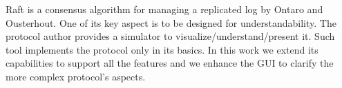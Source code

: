 Raft is a consensus algorithm for managing a replicated log by Ontaro and Ousterhout.
One of its key aspect is to be designed for understandability.
The protocol author provides a simulator to visualize/understand/present it.
Such tool implements the protocol only in its basics.
In this work we extend its capabilities to support all the features
and we enhance the GUI to clarify the more complex protocol's aspects.
